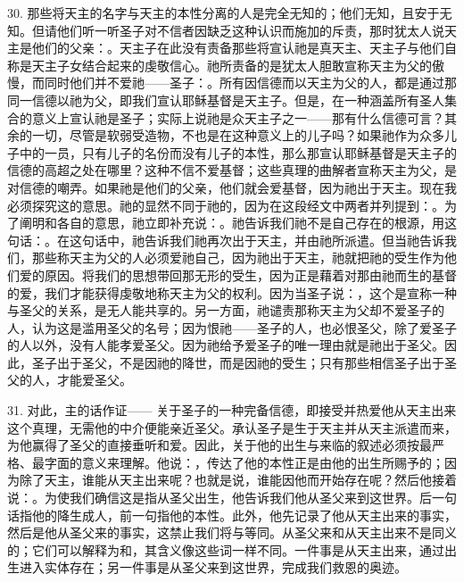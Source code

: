 30. 那些将天主的名字与天主的本性分离的人是完全无知的；他们无知，且安于无知。但请他们听一听圣子对不信者因缺乏这种认识而施加的斥责，那时犹太人说天主是他们的父亲：。天主子在此没有责备那些将宣认祂是真天主、天主子与他们自称是天主子女结合起来的虔敬信心。祂所责备的是犹太人胆敢宣称天主为父的傲慢，而同时他们并不爱祂——圣子：。所有因信德而以天主为父的人，都是通过那同一信德以祂为父，即我们宣认耶稣基督是天主子。但是，在一种涵盖所有圣人集合的意义上宣认祂是圣子；实际上说祂是众天主子之一——那有什么信德可言？其余的一切，尽管是软弱受造物，不也是在这种意义上的儿子吗？如果祂作为众多儿子中的一员，只有儿子的名份而没有儿子的本性，那么那宣认耶稣基督是天主子的信德的高超之处在哪里？这种不信不爱基督；这些真理的曲解者宣称天主为父，是对信德的嘲弄。如果祂是他们的父亲，他们就会爱基督，因为祂出于天主。现在我必须探究这的意思。祂的显然不同于祂的，因为在这段经文中两者并列提到：。为了阐明和各自的意思，祂立即补充说：。祂告诉我们祂不是自己存在的根源，用这句话：。在这句话中，祂告诉我们祂再次出于天主，并由祂所派遣。但当祂告诉我们，那些称天主为父的人必须爱祂自己，因为祂出于天主，祂就把祂的受生作为他们爱的原因。将我们的思想带回那无形的受生，因为正是藉着对那由祂而生的基督的爱，我们才能获得虔敬地称天主为父的权利。因为当圣子说：，这个是宣称一种与圣父的关系，是无人能共享的。另一方面，祂谴责那称天主为父却不爱圣子的人，认为这是滥用圣父的名号；因为恨祂——圣子的人，也必恨圣父，除了爱圣子的人以外，没有人能孝爱圣父。因为祂给予爱圣子的唯一理由就是祂出于圣父。因此，圣子出于圣父，不是因祂的降世，而是因祂的受生；只有那些相信圣子出于圣父的人，才能爱圣父。\par

31. 对此，主的话作证——  关于圣子的一种完备信德，即接受并热爱他从天主出来这个真理，无需他的中介便能亲近圣父。承认圣子是生于天主并从天主派遣而来，为他赢得了圣父的直接垂听和爱。因此，关于他的出生与来临的叙述必须按最严格、最字面的意义来理解。他说：，传达了他的本性正是由他的出生所赐予的；因为除了天主，谁能从天主出来呢？也就是说，谁能因他而开始存在呢？然后他接着说：。为使我们确信这是指从圣父出生，他告诉我们他从圣父来到这世界。后一句话指他的降生成人，前一句指他的本性。此外，他先记录了他从天主出来的事实，然后是他从圣父来的事实，这禁止我们将与等同。从圣父来和从天主出来不是同义的；它们可以解释为和，其含义像这些词一样不同。一件事是从天主出来，通过出生进入实体存在；另一件事是从圣父来到这世界，完成我们救恩的奥迹。\par

